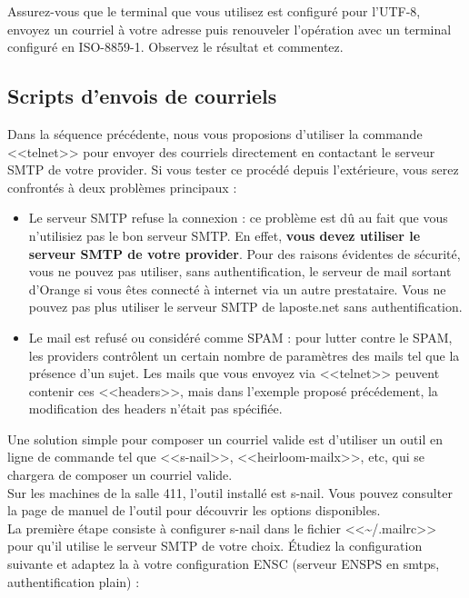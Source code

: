 \documentclass[11pt]{article}
\begin{document}
Assurez-vous que le terminal que vous utilisez est configuré pour l'UTF-8,
envoyez un courriel à votre adresse puis renouveler l'opération avec un
terminal configuré en ISO-8859-1. Observez le résultat et commentez.

\subsection{Scripts d'envois de courriels}

Dans la séquence précédente, nous vous proposions d'utiliser la commande
<<telnet>> pour envoyer des courriels directement en contactant le serveur SMTP
de votre provider. Si vous tester ce procédé depuis l'extérieure, vous serez
confrontés à deux problèmes principaux :\\

\begin{itemize}
 \item Le serveur SMTP refuse la connexion : ce problème est dû
au fait que vous n'utilisiez pas le bon serveur SMTP. En effet, \textbf{vous
devez utiliser le serveur SMTP de votre provider}. Pour des raisons évidentes
de sécurité, vous ne pouvez pas utiliser, sans authentification, le serveur de
mail sortant d'Orange si vous êtes connecté à internet via un autre
prestataire. Vous ne pouvez pas plus utiliser le serveur SMTP de laposte.net
sans authentification.\\
 \item Le mail est refusé ou considéré comme SPAM :
pour lutter contre le SPAM, les providers contrôlent un certain nombre de
paramètres des mails tel que la présence d'un sujet. Les mails que vous envoyez
via <<telnet>> peuvent contenir ces <<headers>>, mais dans l'exemple proposé 
précédement, la modification des headers n'était pas spécifiée.\\
\end{itemize}

Une solution simple pour composer un courriel valide est d'utiliser un outil en
ligne de commande tel que <<s-nail>>, <<heirloom-mailx>>, etc, qui se chargera
de composer un courriel valide.\\

Sur les machines de la salle 411, l'outil installé est s-nail. Vous
pouvez consulter la page de manuel de l'outil pour découvrir les options
disponibles.\\

La première étape consiste à configurer s-nail dans le fichier
<<\textasciitilde{}/.mailrc>> pour qu'il utilise le serveur SMTP de votre
choix. Étudiez la configuration suivante et adaptez la à votre configuration
ENSC (serveur ENSPS en smtps, authentification plain) :
\end{document}
